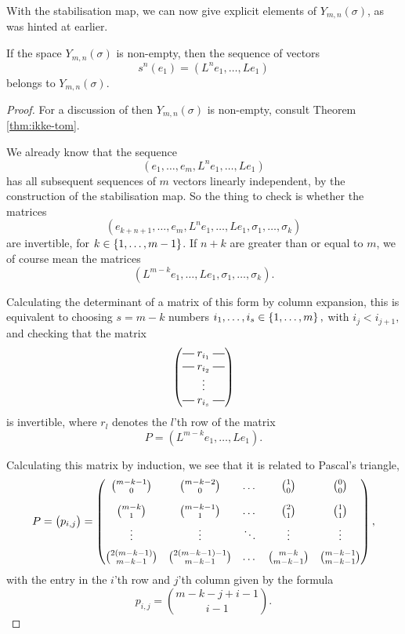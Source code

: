 With the stabilisation map, we can now give explicit elements of
$Y_{m,n}(\sigma)$, as was hinted at earlier.

\begin{theorem}
  \label{thm:eksplicit-element}
  If the space $Y_{m,n}(\sigma)$ is non-empty, then the sequence of
  vectors
  \[ s^n(e_1) = \left(L^n e_1,\dots,Le_1\right) \]
  belongs to $Y_{m,n}(\sigma)$.
\end{theorem}
\begin{proof}
  For a discussion of then $Y_{m,n}(\sigma)$ is non-empty, consult
  Theorem \ref{thm:ikke-tom}.
  
  We already know that the sequence
  \[ \left(e_1,\dots,e_m,L^n e_1,\dots, Le_1 \right) \]
  has all subsequent sequences of $m$ vectors linearly independent,
  by the construction of the stabilisation map. So the thing to check
  is whether the matrices
  \[ \left(e_{k+n+1}, \dots, e_m,L^n e_1, \dots, Le_1, \sigma_1, \dots,
    \sigma_{k}\right) \]
  are invertible, for $k \in \left\{ 1,\dots,m-1 \right\}$. If $n+k$ are greater
  than or equal to $m$, we of course mean the matrices
  \[ \left( L^{m-k}e_1,\dots,L e_1,\sigma_1,\dots,\sigma_k \right). \]
  
  Calculating the determinant of a matrix of this form by column
  expansion, this is equivalent to choosing $s=m-k$ numbers
  $i_1,\dots,i_s \in \left\{ 1,\dots,m \right\},$ with $i_j < i_{j+1},$ and checking that the matrix
  \[
  \begin{pmatrix}
    \matrow{r_{i_1}} \\
    \matrow{r_{i_2}} \\
    & \hspace{-0.75em} \vdots & \\
    \matrow{r_{i_s}}
  \end{pmatrix}
  \]
  is invertible, where $r_{l}$ denotes the $l$'th row of the
  matrix
  \[ P = (L^{m-k}e_1,\dots,Le_1). \]
  
  Calculating this matrix by induction, we see that it is related to
  Pascal's triangle,
  \[ P =
  \begin{pmatrix}
    p_{i,j}
  \end{pmatrix}
  =
  \begin{pmatrix}
    {m-k-1 \choose 0}\vspace{1em} & {m-k-2\choose 0} & \dots &
    {1\choose 0} & {0 \choose 0} \\
    {m-k \choose 1} \vspace{0.5em} & {m-k-1 \choose 1} & \dots & {2
      \choose 1} & {1 \choose 1} \\
    \vdots \vspace{0.5em} & \vdots & \ddots & \vdots & \vdots\\
    {2(m-k-1) \choose {m-k-1}} & {2(m-k-1)-1 \choose m-k-1} & \dots &
    {m-k \choose m-k-1} & {m-k-1 \choose m-k-1}
  \end{pmatrix}, \]
  with the entry in the $i$'th row and $j$'th column given by the
  formula
  \[ p_{i,j} = { m-k-j+i-1 \choose i-1}. \] 
  

\end{proof}
